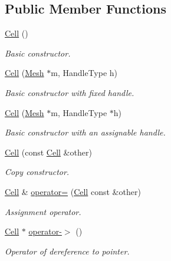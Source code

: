 \subsection*{Public Member Functions}
\begin{DoxyCompactItemize}
\item 
\hyperlink{classINMOST_1_1Cell_a5014e2a8bdc5c5e63d8f56203c446ff2}{Cell} ()
\begin{DoxyCompactList}\small\item\em Basic constructor. \end{DoxyCompactList}\item 
\hyperlink{classINMOST_1_1Cell_a6a5d747177264baf51981526d687160e}{Cell} (\hyperlink{classINMOST_1_1Mesh}{Mesh} $\ast$m, Handle\-Type h)
\begin{DoxyCompactList}\small\item\em Basic constructor with fixed handle. \end{DoxyCompactList}\item 
\hyperlink{classINMOST_1_1Cell_a3775295eb0087a53085e760ef15f7a5e}{Cell} (\hyperlink{classINMOST_1_1Mesh}{Mesh} $\ast$m, Handle\-Type $\ast$h)
\begin{DoxyCompactList}\small\item\em Basic constructor with an assignable handle. \end{DoxyCompactList}\item 
\hyperlink{classINMOST_1_1Cell_a2caed8dde9efdcd45bbab752beb1bc48}{Cell} (const \hyperlink{classINMOST_1_1Cell}{Cell} \&other)
\begin{DoxyCompactList}\small\item\em Copy constructor. \end{DoxyCompactList}\item 
\hyperlink{classINMOST_1_1Cell}{Cell} \& \hyperlink{classINMOST_1_1Cell_a42506f458c54cc177a56444d88b01770}{operator=} (\hyperlink{classINMOST_1_1Cell}{Cell} const \&other)
\begin{DoxyCompactList}\small\item\em Assignment operator. \end{DoxyCompactList}\item 
\hyperlink{classINMOST_1_1Cell}{Cell} $\ast$ \hyperlink{classINMOST_1_1Cell_a56ea16402b10b39c53c7c0fbc60ef748}{operator-\/$>$} ()
\begin{DoxyCompactList}\small\item\em Operator of dereference to pointer. \end{DoxyCompactList}\item 

\end{DoxyCompactItemize}
